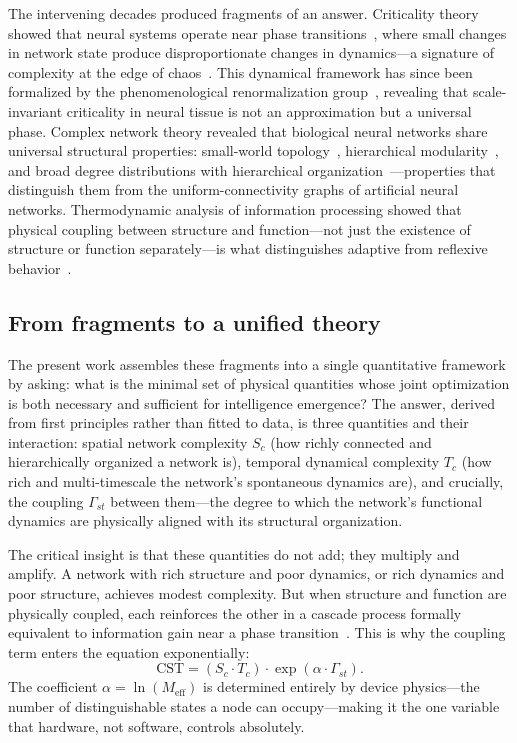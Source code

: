 \documentclass[12pt]{article}
\newcommand{\CST}{\mathrm{CST}}
\newcommand{\Sc}{S_c}
\newcommand{\Tc}{T_c}
\newcommand{\Gst}{\Gamma_{st}}
\newcommand{\Meff}{M_{\mathrm{eff}}}
\begin{document}
The intervening decades produced fragments of an answer. Criticality theory showed that neural systems operate near phase transitions~\cite{beggs2003,shew2009}, where small changes in network state produce disproportionate changes in dynamics---a signature of complexity at the edge of chaos~\cite{strogatz1994}. This dynamical framework has since been formalized by the phenomenological renormalization group~\cite{meshulam2019}, revealing that scale-invariant criticality in neural tissue is not an approximation but a universal phase. Complex network theory revealed that biological neural networks share universal structural properties: small-world topology~\cite{watts1998}, hierarchical modularity~\cite{sporns2016}, and broad degree distributions with hierarchical organization~\cite{barabasi1999,bullmore2009}---properties that distinguish them from the uniform-connectivity graphs of artificial neural networks. Thermodynamic analysis of information processing showed that physical coupling between structure and function---not just the existence of structure or function separately---is what distinguishes adaptive from reflexive behavior~\cite{friston2010}.

\subsection*{From fragments to a unified theory}

The present work assembles these fragments into a single quantitative framework by asking: what is the minimal set of physical quantities whose joint optimization is both necessary and sufficient for intelligence emergence? The answer, derived from first principles rather than fitted to data, is three quantities and their interaction: spatial network complexity $\Sc$ (how richly connected and hierarchically organized a network is), temporal dynamical complexity $\Tc$ (how rich and multi-timescale the network's spontaneous dynamics are), and crucially, the coupling $\Gst$ between them---the degree to which the network's functional dynamics are physically aligned with its structural organization.

The critical insight is that these quantities do not add; they multiply and amplify. A network with rich structure and poor dynamics, or rich dynamics and poor structure, achieves modest complexity. But when structure and function are physically coupled, each reinforces the other in a cascade process formally equivalent to information gain near a phase transition~\cite{beggs2003}. This is why the coupling term enters the equation exponentially:
\[
\CST = (\Sc \cdot \Tc) \cdot \exp(\alpha \cdot \Gst).
\]
The coefficient $\alpha = \ln(\Meff)$ is determined entirely by device physics---the number of distinguishable states a node can occupy---making it the one variable that hardware, not software, controls absolutely.
\end{document}
